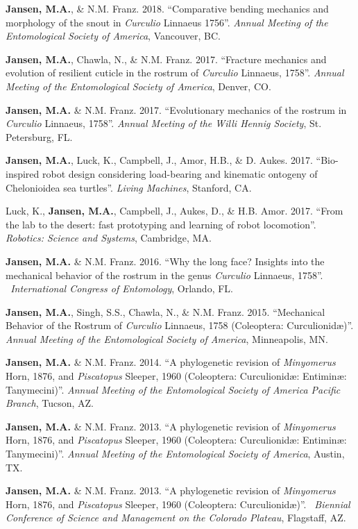 \documentclass[12pt,a4paper]{article}
\begin{document}
\begin{description}
	\item \textbf{Jansen, M.A.}, \& N.M. Franz. 2018. ``Comparative bending mechanics and morphology of the snout in \textit{Curculio} Linnaeus 1756''. \textit{Annual Meeting of the Entomological Society of America}, Vancouver, BC.
	\item \textbf{Jansen, M.A.}, Chawla, N., \& N.M. Franz. 2017. ``Fracture mechanics and evolution of resilient cuticle in the rostrum of \textit{Curculio} Linnaeus, 1758''. \textit{Annual Meeting of the Entomological Society of America}, Denver, CO.
	\item \textbf{Jansen, M.A.} \& N.M. Franz. 2017. ``Evolutionary mechanics of the rostrum in \textit{Curculio} Linnaeus, 1758''. \textit{Annual Meeting of the Willi Hennig Society}, St. Petersburg, FL.
	\item \textbf{Jansen, M.A.}, Luck, K., Campbell, J., Amor, H.B., \& D. Aukes. 2017. ``Bio-inspired robot design considering load-bearing and kinematic ontogeny of Chelonioidea sea turtles''. \textit{Living Machines}, Stanford, CA.
	\item Luck, K., \textbf{Jansen, M.A.}, Campbell, J., Aukes, D., \& H.B. Amor. 2017. ``From the lab to the desert: fast prototyping and learning of robot locomotion''. \textit{Robotics: Science and Systems}, Cambridge, MA.
	\item \textbf{Jansen, M.A.} \& N.M. Franz. 2016. ``Why the long face? Insights into the mechanical behavior of the rostrum in the genus \textit{Curculio} Linnaeus, 1758''. \textit{~International Congress of Entomology}, Orlando, FL.
	\item \textbf{Jansen, M.A.}, Singh, S.S., Chawla, N., \& N.M. Franz. 2015. ``Mechanical Behavior of the Rostrum of \textit{Curculio} Linnaeus, 1758 (Coleoptera: Curculionid\ae)''. \textit{Annual Meeting of the Entomological Society of America}, Minneapolis, MN.
	\item \textbf{Jansen, M.A.} \& N.M. Franz. 2014. ``A phylogenetic revision of \textit{Minyomerus} Horn, 1876, and \textit{Piscatopus} Sleeper, 1960 (Coleoptera: Curculionid\ae: Entimin\ae: Tanymecini)''. \textit{Annual Meeting of the Entomological Society of America Pacific Branch}, Tucson, AZ.
	\item \textbf{Jansen, M.A.} \& N.M. Franz. 2013. ``A phylogenetic revision of \textit{Minyomerus} Horn, 1876, and \textit{Piscatopus} Sleeper, 1960 (Coleoptera: Curculionid\ae: Entimin\ae: Tanymecini)''. \textit{Annual Meeting of the Entomological Society of America}, Austin, TX.
	\item \textbf{Jansen, M.A.} \& N.M. Franz. 2013. ``A phylogenetic revision of \textit{Minyomerus} Horn, 1876, and \textit{Piscatopus} Sleeper, 1960 (Coleoptera: Curculionid\ae)''. \textit{~Biennial Conference of Science and Management on the Colorado Plateau}, Flagstaff, AZ.
\end{description}
\end{document}

